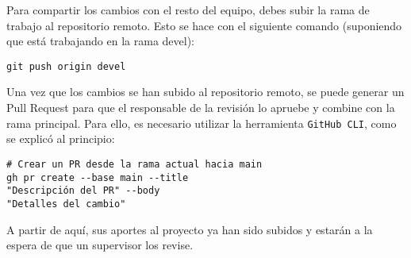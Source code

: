 \documentclass[a4paper]{article}
\begin{document}
Para compartir los cambios con el resto del equipo, debes subir la rama de trabajo al repositorio remoto. Esto se hace con el siguiente comando (suponiendo que está trabajando en la rama devel):

\begin{verbatim}
git push origin devel
\end{verbatim}
\newpage
\thispagestyle{fancy}
Una vez que los cambios se han subido al repositorio remoto, se puede generar un Pull Request para que el responsable de la revisión lo apruebe y combine con la rama principal. Para ello, es necesario utilizar la herramienta \texttt{GitHub CLI}, como se explicó al principio:

\begin{verbatim}
# Crear un PR desde la rama actual hacia main
gh pr create --base main --title 
"Descripción del PR" --body 
"Detalles del cambio"
\end{verbatim}

A partir de aquí, sus aportes al proyecto ya han sido subidos y estarán a la espera de que un supervisor los revise.
\end{document}
